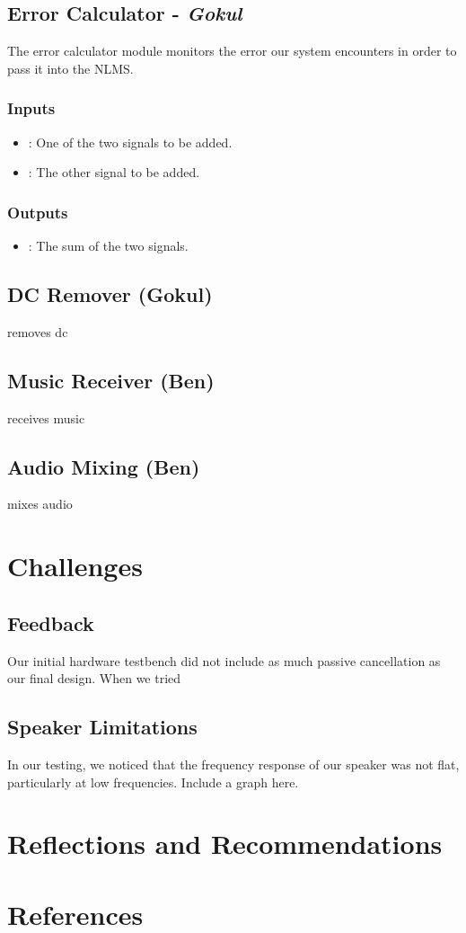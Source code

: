 \documentclass{fpgairpods}
\begin{document}
\subsection{Error Calculator - \textit{Gokul}}
The error calculator module monitors the error our system encounters in order to pass it into the NLMS.

\subsubsection{Inputs}
\begin{itemize}
    \item {}: One of the two signals to be added.
    \item {}: The other signal to be added.
\end{itemize}
\subsubsection{Outputs}
\begin{itemize}
    \item {}: The sum of the two signals.
\end{itemize}

\subsection{DC Remover (Gokul)}
removes dc

\subsection{Music Receiver (Ben)}
receives music

\subsection{Audio Mixing (Ben)}
mixes audio

\section{Challenges}
\subsection{Feedback}
Our initial hardware testbench did not include as much passive cancellation as our final design. When we tried 

\subsection{Speaker Limitations}
In our testing, we noticed that the frequency response of our speaker was not flat, particularly at low frequencies. Include a graph here.

\section{Reflections and Recommendations}

\section{References}

\printbibliography
\end{document}
